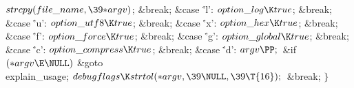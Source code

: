 ${}\index{strcpy+\\{strcpy}}\\{strcpy}(\index{file name+\\{file\_name}}\\{file\_name},\39{*}\index{argv+\\{argv}}\\{argv}){}$;\5
\&{break};\6
\4\&{case} \.{'l'}:\5
${}\index{option log+\\{option\_log}}\\{option\_log}\K\\{true}{}$;\5
\&{break};\6
\4\&{case} \.{'u'}:\5
${}\index{option utf8+\\{option\_utf8}}\\{option\_utf8}\K\\{true}{}$;\5
\&{break};\6
\4\&{case} \.{'x'}:\5
${}\index{option hex+\\{option\_hex}}\\{option\_hex}\K\\{true}{}$;\5
\&{break};\6
\4\&{case} \.{'f'}:\5
${}\index{option force+\\{option\_force}}\\{option\_force}\K\\{true}{}$;\5
\&{break};\6
\4\&{case} \.{'g'}:\5
${}\index{option global+\\{option\_global}}\\{option\_global}\K\\{true}{}$;\5
\&{break};\6
\4\&{case} \.{'c'}:\5
${}\index{option compress+\\{option\_compress}}\\{option\_compress}\K\\{true}{}$;\5
\&{break};\6
\4\&{case} \.{'d'}:\6
${}\index{argv+\\{argv}}\\{argv}\PP;{}$\6
\&{if} ${}({*}\index{argv+\\{argv}}\\{argv}\E\NULL){}$\1\5
\&{goto} \\{explain\_usage};\2\6
${}\index{debugflags+\\{debugflags}}\\{debugflags}\K\index{strtol+\\{strtol}}\\{strtol}({*}\index{argv+\\{argv}}\\{argv},\39\NULL,\39\T{16});{}$\6
\&{break};\6
\4${}\}{}$\2\6
